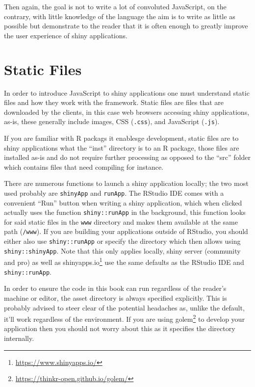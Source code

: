 \documentclass[
]{krantz}
\renewcommand{\href}[2]{#2\footnote{\url{#1}}}
\begin{document}
Then again, the goal is not to write a lot of convoluted JavaScript, on the contrary, with little knowledge of the language the aim is to write as little as possible but demonstrate to the reader that it is often enough to greatly improve the user experience of shiny applications.

\hypertarget{static-files}{%
\section*{Static Files}\label{static-files}}


In order to introduce JavaScript to shiny applications one must understand static files and how they work with the framework. Static files are files that are downloaded by the clients, in this case web browsers accessing shiny applications, as-is, these generally include images, CSS (\texttt{.css}), and JavaScript (\texttt{.js}).

If you are familiar with R packags it enablesge development, static files are to shiny applications what the ``inst'' directory is to an R package, those files are installed as-is and do not require further processing as opposed to the ``src'' folder which contains files that need compiling for instance.

There are numerous functions to launch a shiny application locally; the two most used probably are \texttt{shinyApp} and \texttt{runApp}. The RStudio IDE comes with a convenient ``Run'' button when writing a shiny application, which when clicked actually uses the function \texttt{shiny::runApp} in the background, this function looks for said static files in the \texttt{www} directory and makes them available at the same path (\texttt{/www}). If you are building your applications outside of RStudio, you should either also use \texttt{shiny::runApp} or specify the directory which then allows using \texttt{shiny::shinyApp}. Note that this only applies locally, shiny server (community and pro) as well as \href{https://www.shinyapps.io/}{shinyapps.io} use the same defaults as the RStudio IDE and \texttt{shiny::runApp}.

In order to ensure the code in this book can run regardless of the reader's machine or editor, the asset directory is always specified explicitly. This is probably advised to steer clear of the potential headaches as, unlike the default, it'll work regardless of the environment. If you are using \href{https://thinkr-open.github.io/golem/}{golem} \citep{R-golem} to develop your application then you should not worry about this as it specifies the directory internally.
\end{document}
